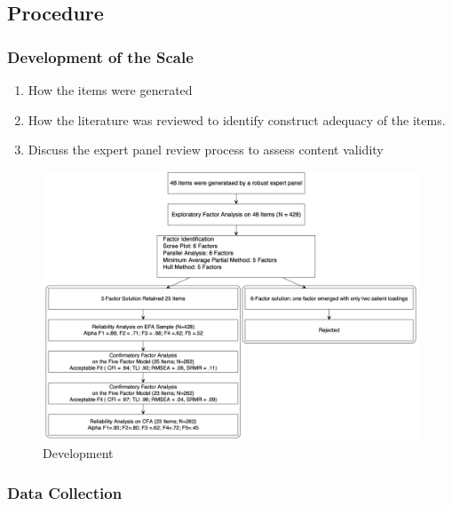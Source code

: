 \documentclass[
  english,
  man]{apa6}
\providecommand{\tightlist}{%
  \setlength{\itemsep}{0pt}\setlength{\parskip}{0pt}}
\begin{document}
\hypertarget{procedure}{%
\subsection{Procedure}\label{procedure}}

\hypertarget{development-of-the-scale}{%
\subsubsection{Development of the Scale}\label{development-of-the-scale}}

\begin{enumerate}
\def\labelenumi{\arabic{enumi}.}
\tightlist
\item
  How the items were generated
\item
  How the literature was reviewed to identify construct adequacy of the items.
\item
  Discuss the expert panel review process to assess content validity
\end{enumerate}

\begin{figure}

{\centering \includegraphics[width=1\linewidth,height=1\textheight]{Manuscript.figures/Flowchart1} 

}

\caption{Development}\label{fig:FlowchartFig}
\end{figure}

\hypertarget{data-collection}{%
\subsubsection{Data Collection}\label{data-collection}}
\end{document}
